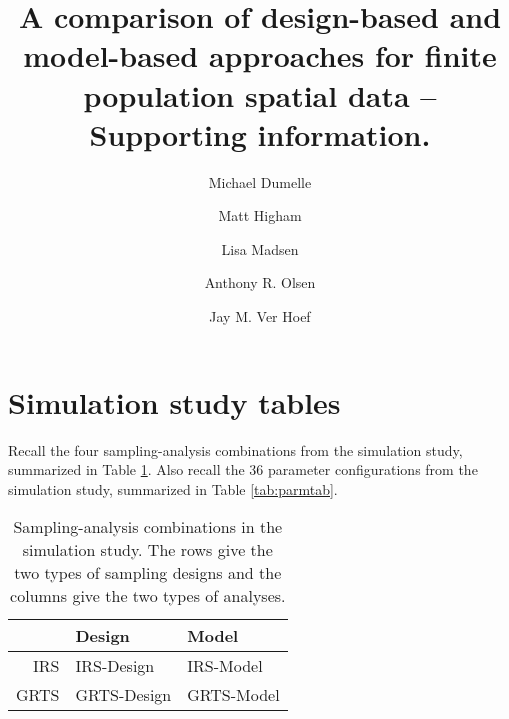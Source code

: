 \documentclass[]{elsarticle} %
\begin{document}
\begin{frontmatter}

  \title{A comparison of design-based and model-based approaches for finite
population spatial data -- Supporting information.}
    \author[USEPA]{Michael Dumelle}
  
    \author[STLAW]{Matt Higham}
  
    \author[OSU]{Lisa Madsen}
  
    \author[USEPA]{Anthony R. Olsen}
  
    \author[NOAA]{Jay M. Ver Hoef}
  
      \address[USEPA]{United States Environmental Protection Agency, 200 SW 35th St,
Corvallis, Oregon, 97333}
    \address[STLAW]{Saint Lawrence University Department of Mathematics, Computer Science,
and Statistics, 23 Romoda Drive, Canton, New York, 13617}
    \address[OSU]{Oregon State University Department of Statistics, 239 Weniger Hall,
Corvallis, Oregon, 97331}
    \address[NOAA]{Marine Mammal Laboratory, Alaska Fisheries Science Center, National
Oceanic and Atmospheric Administration, Seattle, Washington, 98115}
  
  \begin{abstract}
  
  \end{abstract}
  
 \end{frontmatter}

\hypertarget{sec:simtabs}{%
\section{Simulation study tables}\label{sec:simtabs}}

Recall the four sampling-analysis combinations from the simulation
study, summarized in Table \ref{tab:designanalysis}. Also recall the 36
parameter configurations from the simulation study, summarized in Table
\ref{tab:parmtab}.

\begin{table}[ht]
\centering
\begin{tabular}{r|ll}
  \hline
 & Design & Model \\ 
  \hline
IRS & IRS-Design & IRS-Model \\ 
  GRTS & GRTS-Design & GRTS-Model \\ 
   \hline
\end{tabular}
\caption{\label{tab:designanalysis} Sampling-analysis combinations in the simulation study. The rows give the two types of sampling designs and the columns give the two types of analyses.} 
\end{table}
\end{document}
